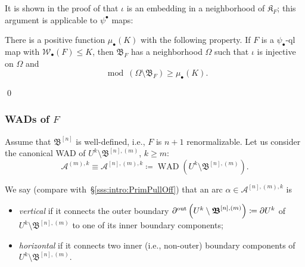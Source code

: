 \documentclass{amsart}
\newcommand{\filled}{{\mathfrak K }}
\newcommand{\WAD}{{\operatorname{WAD}}}
\newcommand{\bush}{{\mathfrak B }}
\newcommand{\bbush}{{\boldsymbol {\mathfrak B} }}
\newcommand{\1}{{\mathbb 1 }}
\newcommand{\Width}{{\mathcal W}}
\renewcommand{\AA}{{\mathcal A}}
\begin{document}
\noindent It is shown in the proof of {\cite[Lemma 2.4]{K}} that $\iota$ is an embedding in a neighborhood of $\filled_F$; this argument is applicable to $\psi^\bullet$ maps:

\begin{lem}
\label{lem:compac:psi bullet} There is a positive function $\mu_\bullet(K)$ with the following property.  If $F$ is a $\psi_\bullet$-ql map with $\Width_\bullet(F)\le K$, then $\bush_F$ has a neighborhood $\Omega$ such that $\iota$ is injective on $\Omega$ and 
\[ \mod \left(\Omega\setminus \bush_F \right) \ge \mu_\bullet(K).\]
\end{lem}\qed



 
 

\subsubsection{WADs of $F$} \label{sss:WADs} Assume that $\bbush^{[n]}$ is well-defined, i.e., $F$ is $n+1$ renormalizable. Let us consider the canonical WAD of $U^k\setminus \bbush^{[n],(m)}$, $k\ge m$:
\[ \AA^{(m),k}\equiv \AA^{[n],(m),k}\coloneqq \WAD\left(U^k\setminus \bbush^{[n],(m)} \right).\]



We say (compare with~\S\ref{sss:intro:PrimPullOff}) that an arc $\alpha\in \AA^{[n],(m),k}$ is 
\begin{itemize}
\item \emph{vertical} if it connects the outer boundary $\partial^\out \left(U^k\setminus \bbush^{[n],(m)}\right)\coloneqq \partial U^k$ of $U^k\setminus \bbush^{[n],(m)}$ to one of its inner boundary components;
\item \emph{horizontal} if it connects two inner (i.e., non-outer) boundary components of $U^k\setminus \bbush^{[n],(m)}$. 
\end{itemize}
\end{document}
